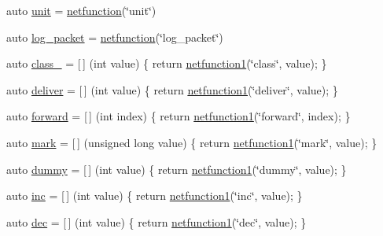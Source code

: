 \begin{DoxyCompactItemize}
\item 
auto \hyperlink{namespacepfq__lang_1_1anonymous__namespace_02default_8hpp_03_ae78caafebdc64f9180032a049b7c3b3a}{unit} = \hyperlink{namespacepfq__lang_a9f546a4602872df5ca74050ecb68a6b3}{netfunction}(\char`\"{}unit\char`\"{})
\item 
auto \hyperlink{namespacepfq__lang_1_1anonymous__namespace_02default_8hpp_03_a82a9b0e4c53eb28a98e5c34372a5b17b}{log\+\_\+packet} = \hyperlink{namespacepfq__lang_a9f546a4602872df5ca74050ecb68a6b3}{netfunction}(\char`\"{}log\+\_\+packet\char`\"{})
\item 
auto \hyperlink{namespacepfq__lang_1_1anonymous__namespace_02default_8hpp_03_a27a683ef93570a66844e1a0106e6336a}{class\+\_\+} = \mbox{[}$\,$\mbox{]} (int value) \{ return \hyperlink{namespacepfq__lang_af215f25fa7ebd61fdc90cf0ef78a3164}{netfunction1}(\char`\"{}class\char`\"{}, value); \}
\item 
auto \hyperlink{namespacepfq__lang_1_1anonymous__namespace_02default_8hpp_03_a9baf04657b3da63a2a6d574bbcdafb76}{deliver} = \mbox{[}$\,$\mbox{]} (int value) \{ return \hyperlink{namespacepfq__lang_af215f25fa7ebd61fdc90cf0ef78a3164}{netfunction1}(\char`\"{}deliver\char`\"{}, value); \}
\item 
auto \hyperlink{namespacepfq__lang_1_1anonymous__namespace_02default_8hpp_03_a7fbe4b2614dd240727bf1696b4d06523}{forward} = \mbox{[}$\,$\mbox{]} (int index) \{ return \hyperlink{namespacepfq__lang_af215f25fa7ebd61fdc90cf0ef78a3164}{netfunction1}(\char`\"{}forward\char`\"{}, index); \}
\item 
auto \hyperlink{namespacepfq__lang_1_1anonymous__namespace_02default_8hpp_03_ad6142fe3a0fc859f25ea16956f52a5f0}{mark} = \mbox{[}$\,$\mbox{]} (unsigned long value) \{ return \hyperlink{namespacepfq__lang_af215f25fa7ebd61fdc90cf0ef78a3164}{netfunction1}(\char`\"{}mark\char`\"{}, value); \}
\item 
auto \hyperlink{namespacepfq__lang_1_1anonymous__namespace_02default_8hpp_03_a876b4be1c6cf97e317f74242d8fb3da4}{dummy} = \mbox{[}$\,$\mbox{]} (int value) \{ return \hyperlink{namespacepfq__lang_af215f25fa7ebd61fdc90cf0ef78a3164}{netfunction1}(\char`\"{}dummy\char`\"{}, value); \}
\item 
auto \hyperlink{namespacepfq__lang_1_1anonymous__namespace_02default_8hpp_03_a14246183085ec07f08ab9b0d53907ae5}{inc} = \mbox{[}$\,$\mbox{]} (int value) \{ return \hyperlink{namespacepfq__lang_af215f25fa7ebd61fdc90cf0ef78a3164}{netfunction1}(\char`\"{}inc\char`\"{}, value); \}
\item 
auto \hyperlink{namespacepfq__lang_1_1anonymous__namespace_02default_8hpp_03_a6e71e558e459e950a4e9beeaaaf12cf6}{dec} = \mbox{[}$\,$\mbox{]} (int value) \{ return \hyperlink{namespacepfq__lang_af215f25fa7ebd61fdc90cf0ef78a3164}{netfunction1}(\char`\"{}dec\char`\"{}, value); \}

\end{DoxyCompactItemize}

